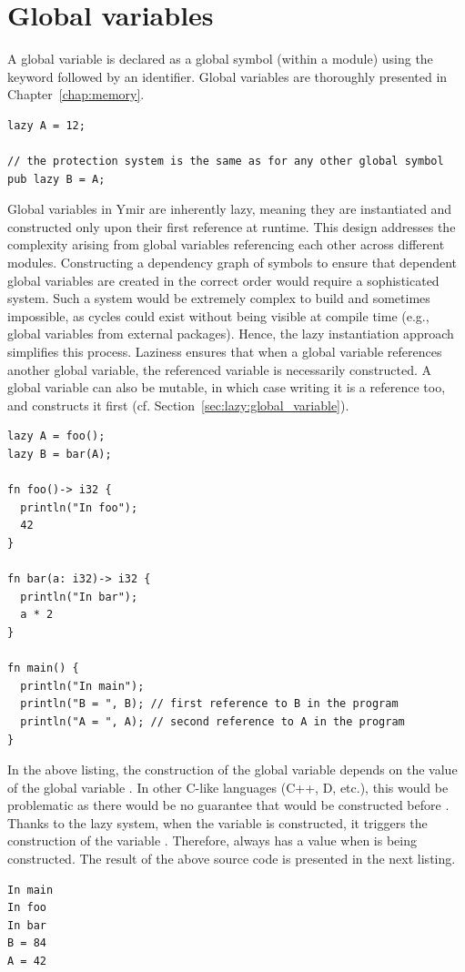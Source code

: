 \section{Global variables}%
\label{sec:global:global_variables}

A global variable is declared as a global symbol (within a module) using the
keyword  followed by an identifier. Global variables are thoroughly
presented in Chapter~\ref{chap:memory}.

\begin{lstlisting}[style=coloredverbatim]
lazy A = 12;

// the protection system is the same as for any other global symbol
pub lazy B = A;
\end{lstlisting}

Global variables in Ymir are inherently lazy, meaning they are instantiated and
constructed only upon their first reference at runtime. This design addresses
the complexity arising from global variables referencing each other across
different modules. Constructing a dependency graph of symbols to ensure that
dependent global variables are created in the correct order would require a
sophisticated system. Such a system would be extremely complex to build and
sometimes impossible, as cycles could exist without being visible at compile
time (e.g., global variables from external packages). Hence, the lazy
instantiation approach simplifies this process. Laziness ensures that when a
global variable references another global variable, the referenced variable is
necessarily constructed. A global variable can also be mutable, in which case
writing it is a reference too, and constructs it first
(cf. Section~\ref{sec:lazy:global_variable}).

\begin{lstlisting}[style=coloredverbatim]
lazy A = foo();
lazy B = bar(A);

fn foo()-> i32 {
  println("In foo");
  42
}

fn bar(a: i32)-> i32 {
  println("In bar");
  a * 2
}

fn main() {
  println("In main");
  println("B = ", B); // first reference to B in the program
  println("A = ", A); // second reference to A in the program
}
\end{lstlisting}

In the above listing, the construction of the global variable  depends
on the value of the global variable . In other C-like languages (C++,
D, etc.), this would be problematic as there would be no guarantee that
 would be constructed before . Thanks to the lazy system, when
the variable  is constructed, it triggers the construction of the
variable . Therefore,  always has a value when  is
being constructed. The result of the above source code is presented in the next
listing.

\begin{lstlisting}[style=bashVerb, escapechar=@+]
In main
In foo
In bar
B = 84
A = 42
\end{lstlisting}

\vfill%
\pagebreak
